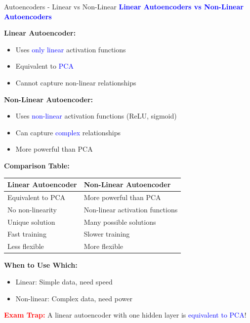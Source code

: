 \documentclass[8pt]{beamer}
\begin{document}
	\begin{frame}{Autoencoders - Linear vs Non-Linear}
		\fontsize{6.5}{7.5}\selectfont
		\textcolor{blue}{\textbf{Linear Autoencoders vs Non-Linear Autoencoders}}
		
		\textbf{Linear Autoencoder:}
		\begin{itemize}
			\item Uses \textcolor{blue}{only linear} activation functions
			\item Equivalent to \textcolor{blue}{PCA}
			\item Cannot capture non-linear relationships
		\end{itemize}
		
		\textbf{Non-Linear Autoencoder:}
		\begin{itemize}
			\item Uses \textcolor{blue}{non-linear} activation functions (ReLU, sigmoid)
			\item Can capture \textcolor{blue}{complex} relationships
			\item More powerful than PCA
		\end{itemize}
		
		\textbf{Comparison Table:}
		
		\begin{tabular}{|p{4cm}|p{4cm}|}
			\hline
			\textbf{Linear Autoencoder} & \textbf{Non-Linear Autoencoder} \\
			\hline
			Equivalent to PCA & More powerful than PCA \\
			\hline
			No non-linearity & Non-linear activation functions \\
			\hline
			Unique solution & Many possible solutions \\
			\hline
			Fast training & Slower training \\
			\hline
			Less flexible & More flexible \\
			\hline
		\end{tabular}
		
		\textbf{When to Use Which:}
		\begin{itemize}
			\item Linear: Simple data, need speed
			\item Non-linear: Complex data, need power
		\end{itemize}
		
		\textcolor{red}{\textbf{Exam Trap:}} A linear autoencoder with one hidden layer is \textcolor{blue}{equivalent to PCA}!
	\end{frame}
	
\end{document}
